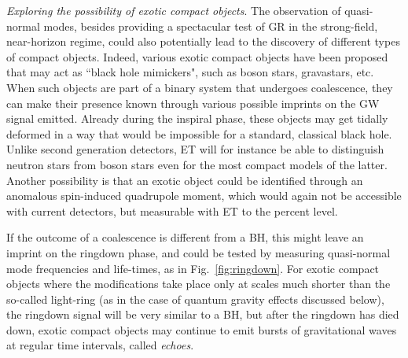 \emph{Exploring the possibility of exotic compact objects}.
The observation of quasi-normal modes, besides providing a spectacular test of GR in the strong-field, near-horizon regime, could also potentially lead to the discovery of different types of compact objects.
Indeed, various exotic compact objects have been proposed that may act as ``black hole mimickers", such as boson stars, gravastars, etc.
When such  objects are part of a binary system that undergoes
coalescence, they can make their presence known through various possible imprints on 
the GW signal emitted. Already during the inspiral phase, these objects may get tidally deformed in a way that would be impossible 
for a standard, classical black hole. Unlike second generation detectors, ET will for instance be able 
to distinguish neutron stars from boson stars even for the most compact models of the latter.  
Another possibility is that an exotic object could be identified through 
an anomalous spin-induced quadrupole moment, which would again not be accessible with 
current detectors, but measurable with ET to the percent level.

If the outcome of a coalescence is different from a BH, this might leave an imprint on  the  ringdown phase, and could be tested by measuring quasi-normal mode frequencies and life-times, as in Fig.~\ref{fig:ringdown}. For exotic compact objects where the modifications take place only at  scales much shorter than the so-called light-ring (as in the case of quantum gravity effects discussed below), the ringdown signal will be very similar to a BH, but after the ringdown has died down, exotic compact objects may continue to 
emit bursts of gravitational waves at regular time intervals, called \emph{echoes}.

